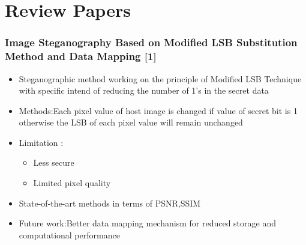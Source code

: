 \documentclass{beamer} %
\theoremstyle{definition} %
\begin{document}
\section{Review Papers}
\begin{frame}
\frametitle{Image Steganography Based on Modified LSB Substitution Method and Data Mapping [1]}
\begin{itemize}
	\item{Steganographic method working on the principle of Modified LSB Technique with specific intend of reducing the number of 1's in the secret data  }
	\item{Methods:Each pixel value of host image is changed if value of secret bit is 1 otherwise the LSB of each pixel value will remain unchanged }
	\item{Limitation :}
	   \begin{itemize}
	   	\item {Less secure}
	   	\item {Limited pixel quality}
	   \end{itemize}
    \item{State-of-the-art methods in terms of PSNR,SSIM  } 
	\item{Future work:Better data mapping mechanism for reduced storage and computational performance  }
\end{itemize}
\end{frame}
\end{document}
